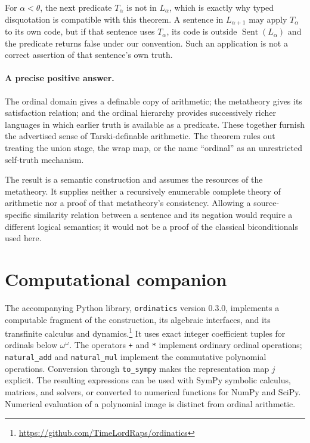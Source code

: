 \documentclass[11pt]{article}
\theoremstyle{definition}
\newcommand{\Sent}{\operatorname{Sent}}
\begin{document}
For $\alpha<\theta$, the next predicate $T_\alpha$ is not in $L_\alpha$, which is exactly why typed disquotation is compatible with this theorem. A sentence in $L_{\alpha+1}$ may apply $T_\alpha$ to its own code, but if that sentence uses $T_\alpha$, its code is outside $\Sent(L_\alpha)$ and the predicate returns false under our convention. Such an application is not a correct assertion of that sentence's own truth.

\paragraph{A precise positive answer.}
The ordinal domain gives a definable copy of arithmetic; the metatheory gives its satisfaction relation; and the ordinal hierarchy provides successively richer languages in which earlier truth is available as a predicate. These together furnish the advertised sense of Tarski-definable arithmetic. The theorem rules out treating the union stage, the wrap map, or the name ``ordinal'' as an unrestricted self-truth mechanism.

The result is a semantic construction and assumes the resources of the metatheory. It supplies neither a recursively enumerable complete theory of arithmetic nor a proof of that metatheory's consistency. Allowing a source-specific similarity relation between a sentence and its negation would require a different logical semantics; it would not be a proof of the classical biconditionals used here.

\section{Computational companion}
The accompanying Python library, \texttt{ordinatics} version 0.3.0, implements a computable fragment of the construction, its algebraic interfaces, and its transfinite calculus and dynamics.\footnote{\url{https://github.com/TimeLordRaps/ordinatics}} It uses exact integer coefficient tuples for ordinals below $\omega^\omega$. The operators \texttt{+} and \texttt{*} implement ordinary ordinal operations; \texttt{natural\_add} and \texttt{natural\_mul} implement the commutative polynomial operations. Conversion through \texttt{to\_sympy} makes the representation map $j$ explicit. The resulting expressions can be used with SymPy symbolic calculus, matrices, and solvers, or converted to numerical functions for NumPy and SciPy. Numerical evaluation of a polynomial image is distinct from ordinal arithmetic.
\end{document}

